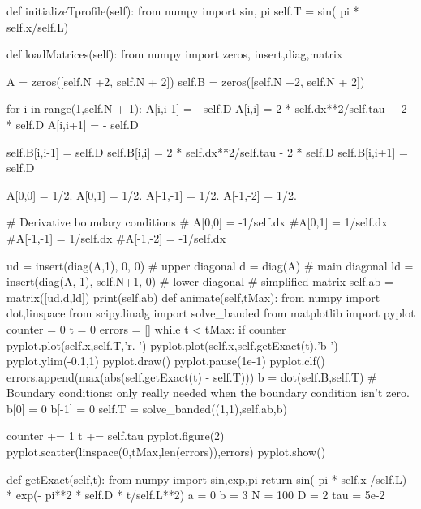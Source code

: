 {\begin{codeexample}
\begin{VerbatimOut}{\listingFile}
    def initializeTprofile(self):
        from numpy import sin, pi
        self.T = sin( pi * self.x/self.L)

    def loadMatrices(self):
        from numpy import zeros, insert,diag,matrix

        A = zeros([self.N +2, self.N + 2])
        self.B = zeros([self.N +2, self.N + 2])

        for i in range(1,self.N + 1):
            A[i,i-1] = - self.D
            A[i,i] = 2 * self.dx**2/self.tau  + 2 * self.D
            A[i,i+1] = - self.D

            self.B[i,i-1] = self.D
            self.B[i,i] = 2 * self.dx**2/self.tau  - 2 * self.D
            self.B[i,i+1] = self.D

        A[0,0] = 1/2.
        A[0,1] = 1/2.
        A[-1,-1] = 1/2.
        A[-1,-2] = 1/2.

        # Derivative boundary conditions
        #        A[0,0] = -1/self.dx
        #A[0,1] = 1/self.dx
        #A[-1,-1] = 1/self.dx
        #A[-1,-2] = -1/self.dx

        ud = insert(diag(A,1), 0, 0) # upper diagonal
        d = diag(A) # main diagonal
        ld = insert(diag(A,-1), self.N+1, 0) # lower diagonal
        # simplified matrix
        self.ab = matrix([ud,d,ld])
        print(self.ab)
    def animate(self,tMax):
        from numpy import dot,linspace
        from scipy.linalg import solve_banded
        from matplotlib import pyplot
        counter = 0
        t = 0
        errors = []
        while t < tMax:
            if counter %
                pyplot.plot(self.x,self.T,'r.-')
                pyplot.plot(self.x,self.getExact(t),'b-')
                pyplot.ylim(-0.1,1)
                pyplot.draw()
                pyplot.pause(1e-1)
                pyplot.clf()
            errors.append(max(abs(self.getExact(t) - self.T)))
            b = dot(self.B,self.T)
            # Boundary conditions: only really needed when the boundary condition isn't zero.
            b[0] = 0
            b[-1] = 0
            self.T = solve_banded((1,1),self.ab,b)

            counter += 1
            t += self.tau
        pyplot.figure(2)
        pyplot.scatter(linspace(0,tMax,len(errors)),errors)
        pyplot.show()
        
    def getExact(self,t):
        from numpy import sin,exp,pi
        return sin( pi * self.x /self.L) * exp(- pi**2 * self.D * t/self.L**2)
a = 0
b = 3
N = 100
D = 2
tau = 5e-2


\end{VerbatimOut}
\end{codeexample}}
